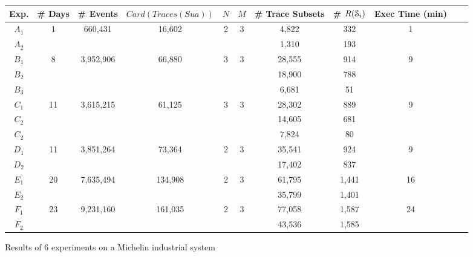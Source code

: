 \begin{figure}
\begin{center}
\begin{tabular}{| c | c | c | c | c | c | c | c | c | c | c |}
\hline
Exp. & \# Days & \# Events & $Card(Traces(Sua))$ & $N$ & $M$ & \# Trace Subsets & \# $R(\EuScript{S}_i)$ & Exec Time (min)\\
\hline
\hline
$A_1$ & 1     & 660,431   & 16,602  & 2 & 3 & 4,822  & 332   & 1 \\
$A_2$ &       &           &         &   &   & 1,310  & 193   &   \\
\hline
$B_1$ & 8     & 3,952,906 & 66,880  & 3 & 3 & 28,555 & 914   & 9 \\
$B_2$ &       &           &         &   &   & 18,900 & 788   &   \\
$B_3$ &       &           &         &   &   &  6,681 &  51   &   \\
\hline
$C_1$ & 11    & 3,615,215 & 61,125  & 3 & 3 & 28,302 & 889   & 9 \\
$C_2$ &       &           &         &   &   & 14,605 & 681   &   \\
$C_2$ &       &           &         &   &   &  7,824 &  80   &   \\
\hline
$D_1$ & 11    & 3,851,264 & 73,364  & 2 & 3 & 35,541 & 924   & 9 \\
$D_2$ &       &           &         &   &   & 17,402 & 837   &   \\
\hline
$E_1$ & 20    & 7,635,494 & 134,908 & 2 & 3 & 61,795 & 1,441 & 16 \\
$E_2$ &       &           &         &   &   & 35,799 & 1,401 &    \\
\hline
$F_1$ & 23    & 9,231,160 & 161,035 & 2 & 3 & 77,058 & 1,587 & 24 \\
$F_2$ &       &           &         &   &   & 43,536 & 1,585 &    \\
\hline
\end{tabular}
\end{center}

    \caption{Results of 6 experiments on a Michelin industrial system}
    \label{fig:results}
\end{figure}

